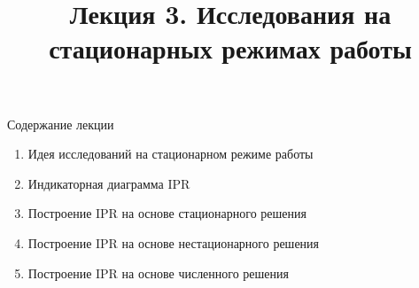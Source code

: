 \documentclass[aspectratio=169, 11pt]{beamer} %
\institute[\university]{\university \\ \faculty}
\title[\docname]{Лекция 3. Исследования на стационарных режимах работы}
\author[\tutorname]{\small  \tutorname}
\date{\the\year}
\begin{document}
\begin{frame}
	\titlepage
\end{frame}
\begin{frame}{Содержание лекции}
	\begin{enumerate}
		\item Идея исследований на стационарном режиме работы
		\item Индикаторная диаграмма IPR
		\item Построение IPR на основе стационарного решения
		\item Построение IPR на основе нестационарного решения
		\item Построение IPR на основе численного решения
	\end{enumerate}

\end{frame}
\end{document}
